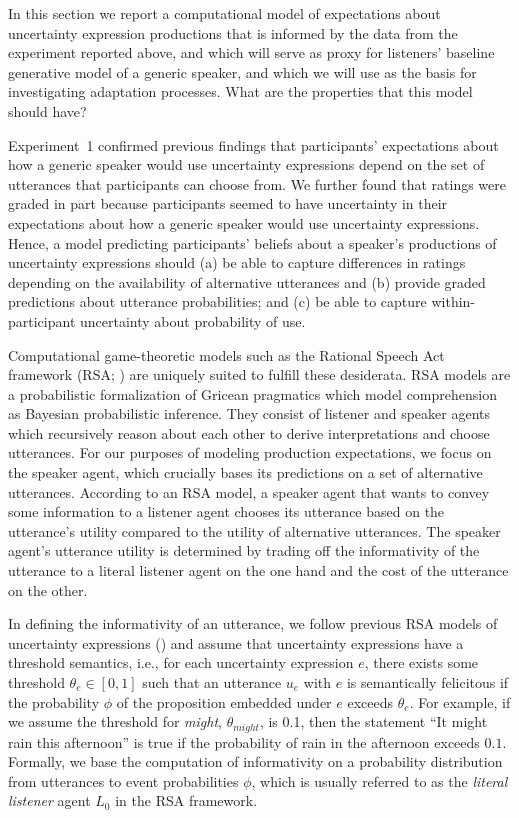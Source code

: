 \documentclass[man, floatsintext]{apa6}
\begin{document}
In this section we report a computational model of expectations about uncertainty expression productions that is informed by the data from the experiment reported above, and which will serve as proxy for listeners' baseline generative model of a generic speaker, and which we will use as the basis for investigating adaptation processes. What are the properties that this model should have?

Experiment~1 confirmed previous findings that participants' expectations 
about how a generic speaker would use uncertainty expressions 
depend on the set of utterances that participants can choose from.
We further found that ratings were graded in part because participants seemed to have uncertainty
in their expectations about how a generic speaker would use uncertainty expressions. 
Hence, a model predicting participants' beliefs about a speaker's productions of uncertainty expressions
 should  (a) be able to capture differences in ratings depending on the availability of alternative utterances and
(b) provide graded predictions about utterance probabilities; 
and (c) be able to capture within-participant uncertainty about probability of use.

Computational game-theoretic models such as the Rational Speech Act 
framework (RSA; \cite{Goodman2016})  are uniquely suited to fulfill these desiderata.
RSA models are a probabilistic formalization of Gricean pragmatics which model comprehension as Bayesian probabilistic inference. 
They consist of listener and speaker agents which recursively reason about each other to derive interpretations and choose utterances. 
For our purposes of modeling production expectations, we focus on the speaker agent, which crucially bases its predictions on a set of alternative utterances. 
  According to an RSA model, a speaker agent that wants to
 convey some information to a listener agent
chooses its utterance based on the utterance's utility compared to the utility of alternative utterances. 
The speaker agent's utterance utility  is determined by trading off the informativity of the utterance to a literal listener agent on the one hand and the cost of the utterance on the other.

In defining the informativity of an utterance, we follow previous RSA models of uncertainty expressions (\cite{Lassiter2017b,Herbstritt2019}) 
and assume that uncertainty expressions have a threshold semantics, 
i.e., for each uncertainty expression $e$, there exists some threshold $\theta_e \in [0,1]$ 
such that an utterance $u_e$ with $e$ is semantically felicitous if the probability $\phi$ 
of the proposition embedded under $e$ exceeds $\theta_e$. 
For example, if we assume the threshold for \textit{might}, $\theta_{might}$, is 0.1, then the statement 
``It might rain this afternoon'' is true if the probability of rain in the afternoon exceeds $0.1$. 
Formally, we base the computation of informativity on a probability distribution from utterances to event probabilities $\phi$, 
which is usually referred to as the \textit{literal listener} agent $L_0$ in the RSA framework. 
\end{document}
